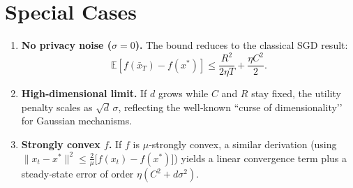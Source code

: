 \documentclass{article}
\newcommand{\EE}{\mathbb{E}}
\begin{document}
\section*{Special Cases}
\begin{enumerate}
\item \textbf{No privacy noise ($\sigma=0$).}  
The bound reduces to the classical SGD result:
\[
\EE[f(\bar x_T)-f(x^{*})]\le
\frac{R^{2}}{2\eta T}+\frac{\eta C^{2}}{2}.
\]
\item \textbf{High‑dimensional limit.}  
If $d$ grows while $C$ and $R$ stay fixed, the utility penalty scales as
$\sqrt{d}\,\sigma$, reflecting the well‑known “curse of dimensionality’’ for
Gaussian mechanisms.
\item \textbf{Strongly convex $f$.}  
If $f$ is $\mu$‑strongly convex, a similar derivation (using
$\|x_t-x^{*}\|^{2}\le \frac{2}{\mu}\bigl[f(x_t)-f(x^{*})\bigr]$) yields a linear
convergence term plus a steady‑state error of order $\eta(C^{2}+d\sigma^{2})$.
\end{enumerate}
\end{document}
